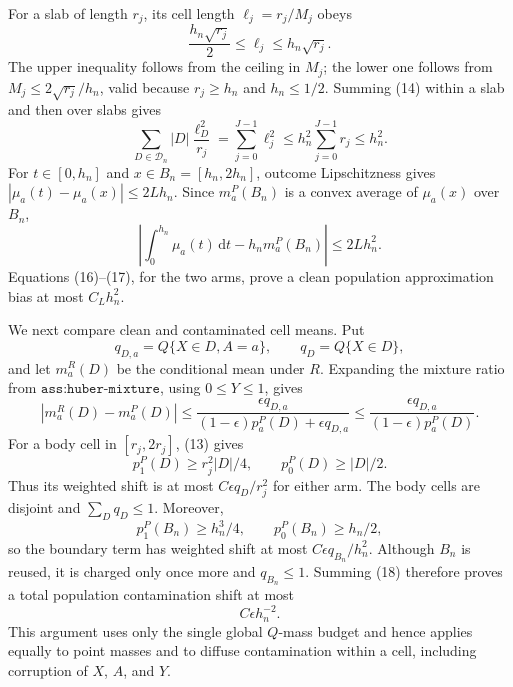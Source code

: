 For a slab of length \(r_j\), its cell length \(\ell_j=r_j/M_j\) obeys
\[
 \frac{h_n\sqrt{r_j}}2\leq\ell_j\leq h_n\sqrt{r_j}. \tag{15}
\]
The upper inequality follows from the ceiling in \(M_j\); the lower one follows from \(M_j\leq2\sqrt{r_j}/h_n\), valid because \(r_j\geq h_n\) and \(h_n\leq1/2\).  Summing (14) within a slab and then over slabs gives
\[
 \sum_{D\in\mathcal D_n}|D|\frac{\ell_D^2}{r_j}
 =\sum_{j=0}^{J-1}\ell_j^2
 \leq h_n^2\sum_{j=0}^{J-1}r_j
 \leq h_n^2. \tag{16}
\]
For \(t\in[0,h_n]\) and \(x\in B_n=[h_n,2h_n]\), outcome Lipschitzness gives \(|\mu_a(t)-\mu_a(x)|\leq2Lh_n\).  Since \(m_a^P(B_n)\) is a convex average of \(\mu_a(x)\) over \(B_n\),
\[
 \left|\int_0^{h_n}\mu_a(t)\,\mathrm dt-h_nm_a^P(B_n)\right|
 \leq2Lh_n^2. \tag{17}
\]
Equations (16)--(17), for the two arms, prove a clean population approximation bias at most \(C_Lh_n^2\).

We next compare clean and contaminated cell means.  Put
\[
 q_{D,a}=Q\{X\in D,A=a\},\qquad q_D=Q\{X\in D\},
\]
and let \(m_a^R(D)\) be the conditional mean under \(R\).  Expanding the mixture ratio from \(\texttt{ass:huber-mixture}\), using \(0\leq Y\leq1\), gives
\[
 |m_a^R(D)-m_a^P(D)|
 \leq\frac{\epsilon q_{D,a}}
 {(1-\epsilon)p_a^P(D)+\epsilon q_{D,a}}
 \leq\frac{\epsilon q_{D,a}}{(1-\epsilon)p_a^P(D)}. \tag{18}
\]
For a body cell in \([r_j,2r_j]\), (13) gives
\[
 p_1^P(D)\geq r_j^2|D|/4,\qquad p_0^P(D)\geq|D|/2.
\]
Thus its weighted shift is at most \(C\epsilon q_D/r_j^2\) for either arm.  The body cells are disjoint and \(\sum_Dq_D\leq1\).  Moreover,
\[
 p_1^P(B_n)\geq h_n^3/4,\qquad p_0^P(B_n)\geq h_n/2,
\]
so the boundary term has weighted shift at most \(C\epsilon q_{B_n}/h_n^2\).  Although \(B_n\) is reused, it is charged only once more and \(q_{B_n}\leq1\).  Summing (18) therefore proves a total population contamination shift at most
\[
 C\epsilon h_n^{-2}. \tag{19}
\]
This argument uses only the single global \(Q\)-mass budget and hence applies equally to point masses and to diffuse contamination within a cell, including corruption of \(X\), \(A\), and \(Y\).

